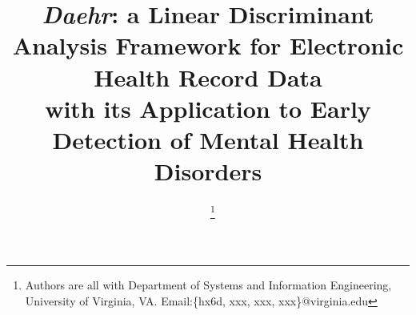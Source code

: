 \documentclass[journal,compsoc]{IEEEtran}
\newcommand{\TheName}{\mbox{\emph{Daehr}}}
\providecommand{\DIFaddbegin}{} %
\providecommand{\DIFaddend}{} %
\providecommand{\DIFdelbegin}{} %
\providecommand{\DIFdelend}{} %
\begin{document}
\title{\TheName{}: a Linear Discriminant Analysis Framework for Electronic Health Record Data \\
 {\LARGE with its Application to Early Detection of Mental Health Disorders}}

\author{~\DIFdelbegin %
\DIFdelend \DIFaddbegin \thanks{Authors are all with Department of Systems and Information Engineering, University of Virginia, VA. Email:\{hx6d, xxx, xxx, xxx\}@virginia.edu}
\DIFaddend }

\DIFdelbegin %

\end{document}

